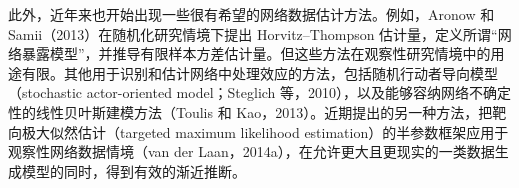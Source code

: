 此外，近年来也开始出现一些很有希望的网络数据估计方法。例如，Aronow 和 Samii（2013）在随机化研究情境下提出 Horvitz--Thompson 估计量，定义所谓“网络暴露模型”，并推导有限样本方差估计量。但这些方法在观察性研究情境中的用途有限。其他用于识别和估计网络中处理效应的方法，包括随机行动者导向模型（stochastic actor-oriented model；Steglich 等，2010），以及能够容纳网络不确定性的线性贝叶斯建模方法（Toulis 和 Kao，2013）。近期提出的另一种方法，把靶向极大似然估计（targeted maximum likelihood estimation）的半参数框架应用于观察性网络数据情境（van der Laan，2014a），在允许更大且更现实的一类数据生成模型的同时，得到有效的渐近推断。
